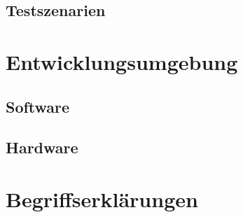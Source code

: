 \documentclass[oneside, ngerman]{sdqtechreport}
\begin{document}
\section{Testszenarien}
\label{sec:Tests:Testszenarien}



\chapter{Entwicklungsumgebung}
\label{chap:Entwicklungsumgebung}

\section{Software}
\label{sec:Entwicklungsumgebung:Software}

\section{Hardware}
\label{sec:Entwicklungsumgebung:Hardware}



\chapter{Begriffserklärungen}
\label{chap:Begriffserklärungen}


\section{}
\end{document}
